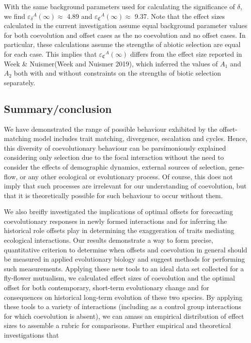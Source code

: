 \documentclass[]{article}
\begin{document}
With the same background parameters used for calculating the
significance of \(\delta\), we find
\({\varepsilon_\delta}^A(\infty)\approx\) 4.89 and
\({\varepsilon_\mathfrak{C}}^A(\infty)\approx\) 9.37. Note that the
effect sizes calculated in the current investigation assume equal
background parameter values for both coevolution and offset cases as the
no coevolution and no offset cases. In particular, these calculations
assume the strengths of abiotic selection are equal for each case. This
implies that \({\varepsilon_\mathfrak{C}}^A(\infty)\) differs from the
effect size reported in Week \& Nuismer(Week and Nuismer 2019), which
inferred the values of \(A_1\) and \(A_2\) both with and without
constraints on the strengths of biotic selection separately.

\hypertarget{summaryconclusion}{%
\subsection{Summary/conclusion}\label{summaryconclusion}}

We have demonstrated the range of possible behaviour exhibited by the
offset-matching model includes trait matching, divergence, escalation
and cycles. Hence, this diversity of coevolutionary behaviour can be
parsimoniously explained considering only selection due to the focal
interaction without the need to consider the effects of demographic
dynamics, external sources of selection, gene-flow, or any other
ecological or evolutionary process. Of course, this does not imply that
such processes are irrelevant for our understanding of coevolution, but
that it is theoretically possible for such behaviour to occur without
them.

We also breifly investigated the implications of optimal offsets for
forecasting coevolutionary responses in newly formed interactions and
for inferring the historical role offsets play in determining the
exaggeration of traits mediating ecological interactions. Our results
demonstrate a way to form precise, quantitative criterion to determine
when offsets and coevolution in general should be measured in applied
evolutionary biology and suggest methods for performing such
measurements. Applying these new tools to an ideal data set collected
for a fly-flower mutualism, we calculated effect sizes of coevolution
and the optimal offset for both contemporary, short-term evolutionary
change and for consequences on historical long-term evolution of these
two species. By applying these tools to a variety of interactions
(including as a control group interactions for which coevolution is
absent), we can amass an empirical distribution of effect sizes to
assemble a rubric for comparisons. Further empirical and theoretical
investigations that
\end{document}
